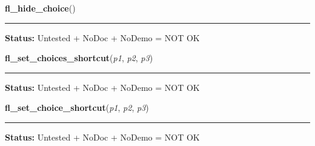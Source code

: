     \vspace{0.5ex}

\hspace{.8\funcindent}\begin{boxedminipage}{\funcwidth}

    \raggedright \textbf{fl\_hide\_choice}()

    \vspace{-1.5ex}

    \rule{\textwidth}{0.5\fboxrule}
\setlength{\parskip}{2ex}
\setlength{\parskip}{1ex}
\textbf{Status:} Untested + NoDoc + NoDemo = NOT OK



    \end{boxedminipage}

    \label{xformslib:library:fl_set_choices_shortcut}

    \vspace{0.5ex}

\hspace{.8\funcindent}\begin{boxedminipage}{\funcwidth}

    \raggedright \textbf{fl\_set\_choices\_shortcut}(\textit{p1}, \textit{p2}, \textit{p3})

    \vspace{-1.5ex}

    \rule{\textwidth}{0.5\fboxrule}
\setlength{\parskip}{2ex}
\setlength{\parskip}{1ex}
\textbf{Status:} Untested + NoDoc + NoDemo = NOT OK



    \end{boxedminipage}

    \label{xformslib:library:fl_set_choices_shortcut}

    \vspace{0.5ex}

\hspace{.8\funcindent}\begin{boxedminipage}{\funcwidth}

    \raggedright \textbf{fl\_set\_choice\_shortcut}(\textit{p1}, \textit{p2}, \textit{p3})

    \vspace{-1.5ex}

    \rule{\textwidth}{0.5\fboxrule}
\setlength{\parskip}{2ex}
\setlength{\parskip}{1ex}
\textbf{Status:} Untested + NoDoc + NoDemo = NOT OK



    \end{boxedminipage}

